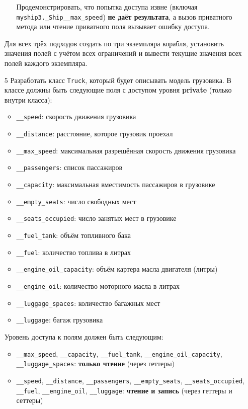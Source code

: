 \begin{enumerate}
\begin{enumerate}
    Продемонстрировать, что попытка доступа извне (включая \texttt{myship3.\_Ship\_\_max\_speed}) \textbf{не даёт результата}, а вызов приватного метода или чтение приватного поля вызывает ошибку доступа.
\end{enumerate}
Для всех трёх подходов создать по три экземпляра корабля, установить значения полей с учётом всех ограничений и вывести текущие значения всех полей каждого экземпляра.
\item[5] Разработать класс \texttt{Truck}, который будет описывать модель грузовика. В классе должны быть следующие поля с доступом уровня \textbf{private} (только внутри класса):
\begin{itemize}
    \item \texttt{\_\_speed}: скорость движения грузовика  
    \item \texttt{\_\_distance}: расстояние, которое грузовик проехал  
    \item \texttt{\_\_max\_speed}: максимальная разрешённая скорость движения грузовика  
    \item \texttt{\_\_passengers}: список пассажиров  
    \item \texttt{\_\_capacity}: максимальная вместимость пассажиров в грузовике  
    \item \texttt{\_\_empty\_seats}: число свободных мест  
    \item \texttt{\_\_seats\_occupied}: число занятых мест в грузовике  
    \item \texttt{\_\_fuel\_tank}: объём топливного бака  
    \item \texttt{\_\_fuel}: количество топлива в литрах  
    \item \texttt{\_\_engine\_oil\_capacity}: объём картера масла двигателя (литры)  
    \item \texttt{\_\_engine\_oil}: количество моторного масла в литрах  
    \item \texttt{\_\_luggage\_spaces}: количество багажных мест  
    \item \texttt{\_\_luggage}: багаж грузовика  
\end{itemize}
Уровень доступа к полям должен быть следующим:
\begin{itemize}
    \item \texttt{\_\_max\_speed}, \texttt{\_\_capacity}, \texttt{\_\_fuel\_tank}, \texttt{\_\_engine\_oil\_capacity}, \texttt{\_\_luggage\_spaces}: \textbf{только чтение} (через геттеры)  
    \item \texttt{\_\_speed}, \texttt{\_\_distance}, \texttt{\_\_passengers}, \texttt{\_\_empty\_seats}, \texttt{\_\_seats\_occupied}, \texttt{\_\_fuel}, \texttt{\_\_engine\_oil}, \texttt{\_\_luggage}: \textbf{чтение и запись} (через геттеры и сеттеры)

\end{itemize}
\end{enumerate}
